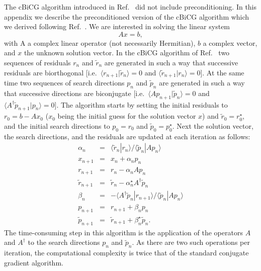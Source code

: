 \documentclass[twocolumn,prb,showpacs,superscriptaddress]{revtex4}
\def\>{\rangle}
\def\<{\langle}
\def\rt{\tilde{r}}
\def\pt{\tilde{p}}
\begin{document}
The cBiCG algorithm introduced in Ref.\  
did not include preconditioning. In this appendix we describe 
the preconditioned version of the cBiCG algorithm which we derived 
following Ref.~.
%
We are interested in solving the linear system
  \begin{equation}\label{eq.axeqb}
  Ax=b,
  \end{equation}
with A a complex linear operator (not necessarily Hermitian), $b$ a complex 
vector, and $x$ the unknown solution vector.
In the cBiCG algorithm of Ref.\  two sequences of residuals $r_n$ and
$\rt_n$ are generated in such a way that successive residuals 
are biorthogonal [i.e.\ $\<r_{n+1}|\rt_n\>=0$ and $\<\rt_{n+1}|r_n\>=0$].
At the same time two sequences of search directions 
$p_n$ and $\pt_n$ are generated in such a way that successive directions
are biconjugate [i.e.\ $\< A p_{n+1}|\pt_n \> =0$ and 
$\< A^\dagger \pt_{n+1}|p_n \> =0$].
The algorithm starts by setting the initial residuals to
$r_0 = b-Ax_0$ ($x_0$ being the initial guess for the solution vector $x$) 
and $\rt_0=r_0^\star$, and the initial search directions to $p_0=r_0$ 
and $\pt_0=p_0^\star$. Next the solution
vector, the search directions, and the residuals are updated at each
iteration as follows:
  \begin{eqnarray}
  \alpha_n & = & \<\rt_n|r_n\>/\<\pt_n|Ap_n\> \label{eq.cg1}  \\ 
  x_{n+1} & = & x_n + \alpha_n p_n \label{eq.cg2} \\ 
  r_{n+1} & = & r_n - \alpha_n Ap_n \label{eq.cg3} \\ 
  \rt_{n+1} & = & \rt_n - \alpha_n^\star A^\dagger \pt_n \label{eq.cg4}\\ 
  \beta_n & = & - \<A^\dagger\pt_n|r_{n+1}\>/\<\pt_n|Ap_n\> \label{eq.cg5}\\ 
  p_{n+1} & = & r_{n+1} + \beta_n p_n \label{eq.cg6}\\ 
  \pt_{n+1} & = & \rt_{n+1} + \beta_n^\star \label{eq.cg7} \pt_n. 
  \end{eqnarray}
The time-consuming step in this algorithm is the application of the operators
$A$ and $A^\dagger$ to the search directions $p_n$ and $\pt_n$. 
As there are two such operations per iteration, the computational complexity 
is twice that of the standard conjugate gradient algorithm.
\end{document}
